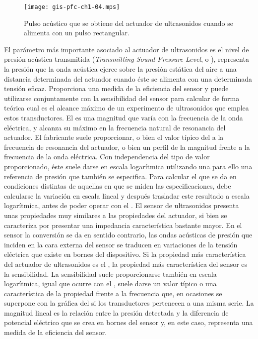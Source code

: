 \begin{figure}
	\begin{center}
		\texttt{[image: gis-pfc-ch1-04.mps]}
	\end{center}
	\caption[Pulso acústico generado por el actuador de
	ultrasonidos]{Pulso acústico que se obtiene del actuador de
	ultrasonidos cuando se alimenta con un pulso rectangular.}
	\label{fig:pulse}
\end{figure}

El parámetro más importante asociado al actuador de ultrasonidos es el
nivel de presión acústica transmitida (\emph{Transmitting Sound Pressure
Level}, o ), representa la presión que la onda acústica ejerce
sobre la presión estática del aire a una distancia determinada del actuador
cuando éste se alimenta con una determinada tensión eficaz. Proporciona una
medida de la eficiencia del sensor y puede utilizarse conjuntamente con la
sensibilidad del sensor para calcular de forma teórica cual es el alcance
máximo de un experimento de ultrasonidos que emplea estos transductores. El
 es una magnitud que varía con la frecuencia de la onda eléctrica,
y alcanza su máximo en la frecuencia natural de resonancia del actuador. El
fabricante suele proporcionar, o bien el valor típico del  a la
frecuencia de resonancia del actuador, o bien un perfil de la magnitud
frente a la frecuencia de la onda eléctrica. Con independencia del tipo de
valor proporcionado, éste suele darse en escala logarítmica utilizando una
para ello una referencia de presión que también se especifica. Para
calcular el  que se da en condiciones distintas de aquellas en que
se miden las especificaciones, debe calcularse la variación en escala
lineal y después trasladar este resultado a escala logarítmica, antes de
poder operar con el . El sensor de ultrasonidos presenta unas
propiedades muy similares a las propiedades del actuador, si bien se
caracteriza por presentar una impedancia característica bastante mayor. En
el sensor la conversión se da en sentido contrario, las ondas acústicas de
presión que inciden en la cara externa del sensor se traducen en
variaciones de la tensión eléctrica que existe en bornes del dispositivo.
Si la propiedad más característica del actuador de ultrasonidos es el
, la propiedad más característica del sensor es la sensibilidad.
La sensibilidad suele proporcionarse también en escala logarítmica, igual
que ocurre con el , suele darse un valor típico o una
característica de la propiedad frente a la frecuencia que, en ocasiones se
superpone con la gráfica del  si los transductores pertenecen a
una misma serie. La magnitud lineal es la relación entre la presión
detectada y la diferencia de potencial eléctrico que se crea en bornes del
sensor y, en este caso, representa una medida de la eficiencia del sensor.

